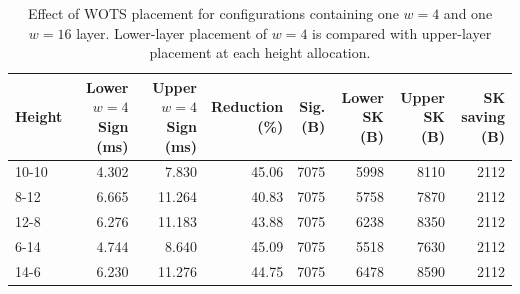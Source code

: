 
\begin{table}[t]
\centering
\caption{Effect of WOTS placement for configurations containing one $w=4$ and one $w=16$ layer. Lower-layer placement of $w=4$ is compared with upper-layer placement at each height allocation.}
\label{tab:wots-placement}
\scriptsize
\setlength{\tabcolsep}{1.5pt}
\begin{tabular}{lrrrrrrr}
\toprule
Height &
\shortstack{Lower $w=4$\\Sign (ms)} &
\shortstack{Upper $w=4$\\Sign (ms)} &
\shortstack{Reduction\\(\%)} &
\shortstack{Sig.\\(B)} &
\shortstack{Lower SK\\(B)} &
\shortstack{Upper SK\\(B)} &
\shortstack{SK saving\\(B)} \\
\midrule
10-10 & 4.302 & 7.830 & 45.06 & 7075 & 5998 & 8110 & 2112 \\
8-12 & 6.665 & 11.264 & 40.83 & 7075 & 5758 & 7870 & 2112 \\
12-8 & 6.276 & 11.183 & 43.88 & 7075 & 6238 & 8350 & 2112 \\
6-14 & 4.744 & 8.640 & 45.09 & 7075 & 5518 & 7630 & 2112 \\
14-6 & 6.230 & 11.276 & 44.75 & 7075 & 6478 & 8590 & 2112 \\
\bottomrule
\end{tabular}
\end{table}
